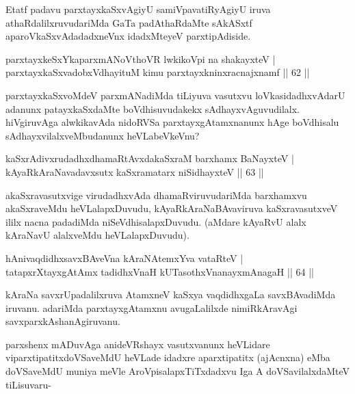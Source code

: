 \begin{artha}
Etatf padavu parxtayxkaSxvAgiyU samiVpavatiRyAgiyU iruva athaRdalilxruvudariMda GaTa padAthaRdaMte sAkASxtf aparoVkaSxvAdadadxneVnx idadxMteyeV parxtipAdiside.
\end{artha}


\begin{shl}
parxtayxkeSxYkaparxmANoV\s thoVR lwkikoV\s pi na shakayxteV |\\
parxtayxkaSxvadobxVdhayituM kimu parxtayxkninxracnajxnamf \hfill || 62 ||
\end{shl}

\begin{artha}
parxtayxkaSxvoMdeV parxmANadiMda tiLiyuva vasutxvu loVkasidadhxvAdarU adanunx patayxkaSxdaMte boVdhisuvudakekx sAdhayxvAguvudilalx. hiVgiruvAga alwkikavAda nidoRVSa parxtayxgAtamxnanunx hAge boVdhisalu sAdhayxvilalxveMbudanunx heVLabeVkeVnu? 
\end{artha}


\begin{shl}
kaSxrAdivxrudadhxdhamaRtAvxdakaSxraM barxhamx BaNayxteV |\\
kAyaRkAraNavadavxsutx kaSxramatarx niSidhayxteV \hfill || 63 ||
\end{shl}

\begin{artha}
akaSxravasutxvige virudadhxvAda dhamaRviruvudariMda barxhamxvu akaSxraveMdu heVLalapxDuvudu, kAyaRkAraNaBAvaviruva kaSxravasutxveV ililx nacna padadiMda niSeVdhisalapxDuvudu. (aMdare kAyaRvU alalx kAraNavU alalxveMdu heVLalapxDuvudu).
\end{artha}


\begin{shl}
hAnivaqdidhxsavxBAveVna kAraNAtemxYva vataRteV |\\
tatapxrXtayxgAtAmx tadidhxVnaH kUTasothxV\s nanayxmAnagaH \hfill || 64 ||
\end{shl}

\begin{artha}
kAraNa savxrUpadalilxruva AtamxneV kaSxya vaqdidhxgaLa savxBAvadiMda iruvanu. adariMda parxtayxgAtamxnu avugaLalilxde nimiRkAravAgi savxparxkAshanAgiruvanu.

parxshenx mADuvAga anideVRshayx vasutxvanunx heVLidare viparxtipatitxdoVSaveMdU heVLade idadxre aparxtipatitx (ajAcnxna) eMba doVSaveMdU muniya meVle AroVpisalapxTiTxdadxvu Iga A doVSavilalxdaMteV tiLisuvaru-
\end{artha}

